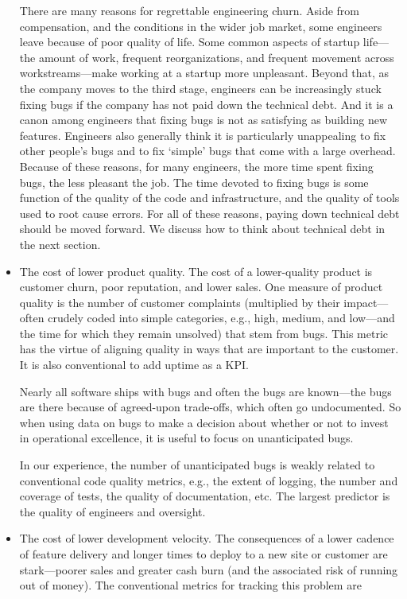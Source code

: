 \documentclass[12pt, letterpaper]{article}
\begin{document}
\begin{itemize}
There are many reasons for regrettable engineering churn. Aside from compensation, and the conditions in the wider job market, some engineers leave because of poor quality of life. Some common aspects of startup life—the amount of work, frequent reorganizations, and frequent movement across workstreams—make working at a startup more unpleasant. Beyond that, as the company moves to the third stage, engineers can be increasingly stuck fixing bugs if the company has not paid down the technical debt. And it is a canon among engineers that fixing bugs is not as satisfying as building new features. Engineers also generally think it is particularly unappealing to fix other people’s bugs and to fix ‘simple’ bugs that come with a large overhead. Because of these reasons, for many engineers, the more time spent fixing bugs, the less pleasant the job. The time devoted to fixing bugs is some function of the quality of the code and infrastructure, and the quality of tools used to root cause errors. For all of these reasons, paying down technical debt should be moved forward. We discuss how to think about technical debt in the next section.

\item The cost of lower product quality. The cost of a lower-quality product is customer churn, poor reputation, and lower sales. One measure of product quality is the number of customer complaints (multiplied by their impact—often crudely coded into simple categories, e.g., high, medium, and low—and the time for which they remain unsolved) that stem from bugs. This metric has the virtue of aligning quality in ways that are important to the customer. It is also conventional to add uptime as a KPI. 

Nearly all software ships with bugs and often the bugs are known—the bugs are there because of agreed-upon trade-offs, which often go undocumented. So when using data on bugs to make a decision about whether or not to invest in operational excellence, it is useful to focus on unanticipated bugs.

In our experience, the number of unanticipated bugs is weakly related to conventional code quality metrics, e.g., the extent of logging, the number and coverage of tests, the quality of documentation, etc. The largest predictor is the quality of engineers and oversight.   

\item The cost of lower development velocity. The consequences of a lower cadence of feature delivery and longer times to deploy to a new site or customer are stark—poorer sales and greater cash burn (and the associated risk of running out of money). The conventional metrics for tracking this problem are


\end{itemize}
\end{document}
